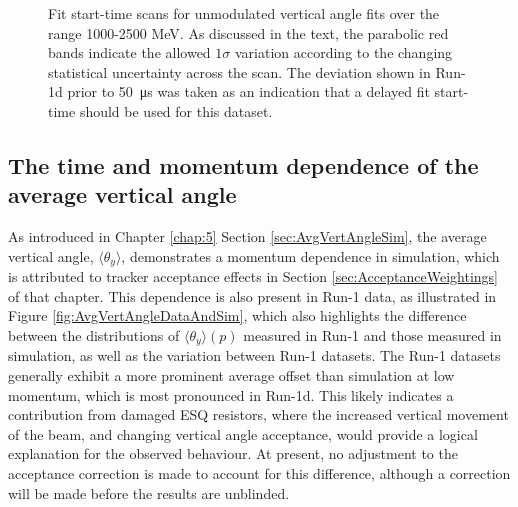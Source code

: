 \begin{figure}[t!]
\caption{Fit start-time scans for unmodulated vertical angle fits over the range 1000-2500 MeV. As discussed in the text, the parabolic red bands indicate the allowed $1\sigma$ variation according to the changing statistical uncertainty across the scan. The deviation shown in Run-1d prior to \SI{50}{\micro\second} was taken as an indication that a delayed fit start-time should be used for this dataset.}
\label{fig:BasicFitStartTime}
\end{figure} 

\subsection{The time and momentum dependence of the average vertical angle}\label{subsec:AvgVertAngleData}
As introduced in Chapter \ref{chap:5} Section \ref{sec:AvgVertAngleSim}, the average vertical angle, $\langle \theta_{y} \rangle$, demonstrates a momentum dependence in simulation, which is attributed to tracker acceptance effects in Section \ref{sec:AcceptanceWeightings} of that chapter. This dependence is also present in Run-1 data, as illustrated in Figure \ref{fig:AvgVertAngleDataAndSim}, which also highlights the difference between the distributions of $\langle \theta_{y} \rangle(p)$ measured in Run-1 and those measured in simulation, as well as the variation between Run-1 datasets. The Run-1 datasets generally exhibit a more prominent average offset than simulation at low momentum, which is most pronounced in Run-1d. This likely indicates a contribution from damaged ESQ resistors, where the increased vertical movement of the beam, and changing vertical angle acceptance, would provide a logical explanation for the observed behaviour. At present, no adjustment to the acceptance correction is made to account for this difference, although a correction will be made before the results are unblinded.


